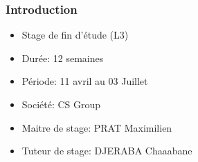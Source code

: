 \begin{frame}
    \frametitle{Introduction}
    \begin{itemize}
        \item Stage de fin d'étude (L3)
        \item Durée: 12 semaines
        \item Période: 11 avril au 03 Juillet
        \item Société: CS Group
        \item Maitre de stage: PRAT Maximilien
        \item Tuteur de stage: DJERABA Chaaabane
    \end{itemize}
\end{frame}